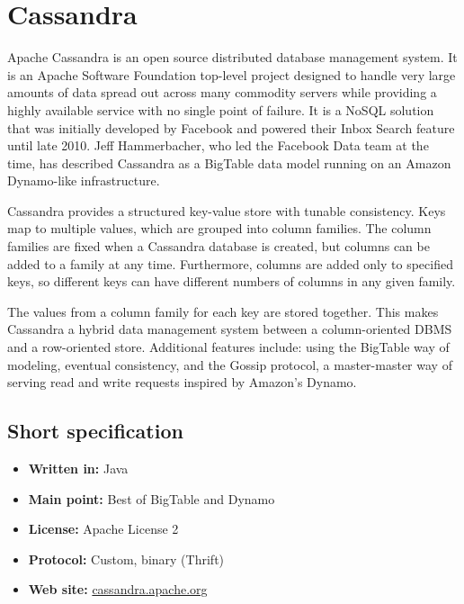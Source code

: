 \chapter{Cassandra}

Apache Cassandra is an open source distributed database management system. It is an Apache Software Foundation top-level project designed to handle very large amounts of data spread out across many commodity servers while providing a highly available service with no single point of failure. It is a NoSQL solution that was initially developed by Facebook and powered their Inbox Search feature until late 2010. Jeff Hammerbacher, who led the Facebook Data team at the time, has described Cassandra as a BigTable data model running on an Amazon Dynamo-like infrastructure.

Cassandra provides a structured key-value store with tunable consistency. Keys map to multiple values, which are grouped into column families. The column families are fixed when a Cassandra database is created, but columns can be added to a family at any time. Furthermore, columns are added only to specified keys, so different keys can have different numbers of columns in any given family.

The values from a column family for each key are stored together. This makes Cassandra a hybrid data management system between a column-oriented DBMS and a row-oriented store. Additional features include: using the BigTable way of modeling, eventual consistency, and the Gossip protocol, a master-master way of serving read and write requests inspired by Amazon's Dynamo.

\section{Short specification}

\begin{itemize}
  \item \textbf{Written in:} Java
  \item \textbf{Main point:} Best of BigTable and Dynamo
  \item \textbf{License:} Apache License 2
  \item \textbf{Protocol:} Custom, binary (Thrift)
  \item \textbf{Web site:} \href{http://cassandra.apache.org/}{cassandra.apache.org}
\end{itemize}